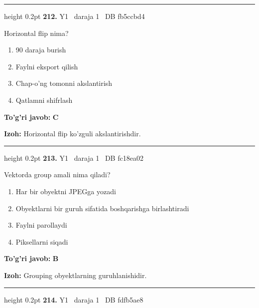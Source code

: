 \documentclass[10pt,a4paper,oneside]{article}
\begin{document}
\vspace{2mm}\hrule height 0.2pt \vspace{4mm}
\hypertarget{q212}{\textbf{\color{ink}212.}}  {\color{muted}\scriptsize Y1 \textbullet\ daraja 1 \textbullet\ DB fb5ccbd4}
\par
Horizontal flip nima?
\begin{enumerate}[label=\Alph*),leftmargin=9mm]
\item 90 daraja burish
\item Faylni eksport qilish
\item Chap-o'ng tomonni akslantirish
\item Qatlamni shifrlash
\end{enumerate}
\begin{tcolorbox}[enhanced,breakable,colback=teal!4,colframe=teal!45!black,boxrule=0.45pt,arc=1.2mm,left=2.8mm,right=2.8mm,top=2mm,bottom=2mm,before skip=2mm,after skip=2mm]
\textbf{\color{teal}To'g'ri javob:} \textbf{C}
\par\smallskip
\textbf{Izoh:} Horizontal flip ko'zguli akslantirishdir.
\end{tcolorbox}
\vspace{2mm}\hrule height 0.2pt \vspace{4mm}
\hypertarget{q213}{\textbf{\color{ink}213.}}  {\color{muted}\scriptsize Y1 \textbullet\ daraja 1 \textbullet\ DB fc18ea02}
\par
Vektorda group amali nima qiladi?
\begin{enumerate}[label=\Alph*),leftmargin=9mm]
\item Har bir obyektni JPEGga yozadi
\item Obyektlarni bir guruh sifatida boshqarishga birlashtiradi
\item Faylni parollaydi
\item Piksellarni siqadi
\end{enumerate}
\begin{tcolorbox}[enhanced,breakable,colback=teal!4,colframe=teal!45!black,boxrule=0.45pt,arc=1.2mm,left=2.8mm,right=2.8mm,top=2mm,bottom=2mm,before skip=2mm,after skip=2mm]
\textbf{\color{teal}To'g'ri javob:} \textbf{B}
\par\smallskip
\textbf{Izoh:} Grouping obyektlarning guruhlanishidir.
\end{tcolorbox}
\vspace{2mm}\hrule height 0.2pt \vspace{4mm}
\hypertarget{q214}{\textbf{\color{ink}214.}}  {\color{muted}\scriptsize Y1 \textbullet\ daraja 1 \textbullet\ DB fdfb5ae8}
\end{document}
